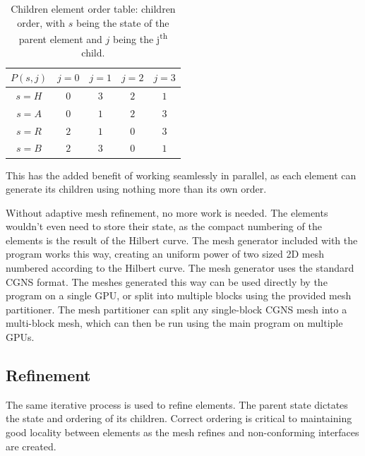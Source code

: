 \begin{table}[H]
	\begin{center}
		\begin{tabular}{ c | c c c c} 
			$P\left ( s, j \right )$ & $j = 0$ & $j = 1$ & $j = 2$ & $j = 3$  \\
			\hline
			$s = H$ & \textcolor{vs_red}{$0$} & \textcolor{vs_red}{$3$} & \textcolor{vs_red}{$2$} & \textcolor{vs_red}{$1$} \\ 
			$s = A$ & \textcolor{vs_blue}{$0$} & \textcolor{vs_blue}{$1$} & \textcolor{vs_blue}{$2$} & \textcolor{vs_blue}{$3$} \\
			$s = R$ & \textcolor{vs_teal}{$2$} & \textcolor{vs_teal}{$1$} & \textcolor{vs_teal}{$0$} & \textcolor{vs_teal}{$3$} \\
			$s = B$ & \textcolor{vs_plum}{$2$} & \textcolor{vs_plum}{$3$} & \textcolor{vs_plum}{$0$} & \textcolor{vs_plum}{$1$} \\
		\end{tabular}
		
		\caption{Children element order table: children order, with $s$ being the state of the parent element and $j$ being the j\textsuperscript{th} child.}
		\label{table:children_ordering}
	\end{center}
\end{table}

This has the added benefit of working seamlessly in parallel, as each element can generate its
children using nothing more than its own order.

Without adaptive mesh refinement, no more work is needed. The elements wouldn't even need to store
their state, as the compact numbering of the elements is the result of the Hilbert curve. The mesh
generator included with the program works this way, creating an uniform power of two sized 2D mesh
numbered according to the Hilbert curve. The mesh generator uses the standard CGNS format. The
meshes generated this way can be used directly by the program on a single GPU, or split into
multiple blocks using the provided mesh partitioner. The mesh partitioner can split any single-block
CGNS mesh into a multi-block mesh, which can then be run using the main program on multiple GPUs.

\subsection{Refinement} \label{section:load_balancing:hilbert_curve:refinement}
The same iterative process is used to refine elements. The parent state dictates the state and
ordering of its children. Correct ordering is critical to maintaining good locality between elements
as the mesh refines and non-conforming interfaces are created.

